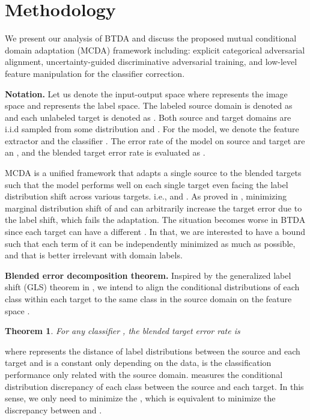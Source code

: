 \documentclass[letterpaper]{article} \usepackage{aaai23}  \usepackage{times}  \usepackage{helvet}  \usepackage{courier}  \usepackage[hyphens]{url}  \usepackage{graphicx} \urlstyle{rm} \def\UrlFont{\rm}  \usepackage{natbib}  \usepackage{caption} \frenchspacing  \setlength{\pdfpagewidth}{8.5in}  \setlength{\pdfpageheight}{11in}
\newtheorem{theorem}{Theorem}
\begin{document}
\section{Methodology}
We present our analysis of BTDA and discuss the proposed mutual conditional domain adaptation (MCDA) framework including: explicit categorical adversarial alignment, uncertainty-guided discriminative adversarial training, and low-level feature manipulation for the classifier correction.

\noindent\textbf{Notation.} Let us denote the input-output space  where  represents the image space and  represents the label space. The labeled source domain is denoted as  and each unlabeled target is denoted as . Both source and target domains are i.i.d sampled from some distribution  and . For the model, we denote the feature extractor  and the classifier . The error rate of the model on source  and target  are  an , and the blended target error rate is evaluated as .

MCDA is a unified framework that adapts a single source to the blended targets such that the model performs well on each single target even facing the label distribution shift across various targets. i.e.,  and .
As proved in \cite{tachet2020domain}, minimizing marginal distribution shift of  and  can arbitrarily increase the target error  due to the label shift, which fails the adaptation. The situation becomes worse in BTDA since each target can have a different . In that, we are interested to have a bound such that each term of it can be independently minimized as much as possible, and that is better irrelevant with domain labels.

\noindent\textbf{Blended error decomposition theorem.} Inspired by the generalized label shift (GLS) theorem in 
\cite{tachet2020domain}, we intend to align the conditional distributions of each class  within each target to the same class in the source domain on the feature space . 
\begin{theorem}
For any classifier , the blended target error rate is
\begin{small}

\label{BER}


\end{small}
\end{theorem}
where  represents the  distance of label distributions between the source and each target and is a constant only depending on the data,  is the classification performance only related with the source domain.  measures the conditional distribution discrepancy of each class between the source and each target. In this sense, we only need to minimize the , which is equivalent to minimize the discrepancy between  and .
\end{document}
